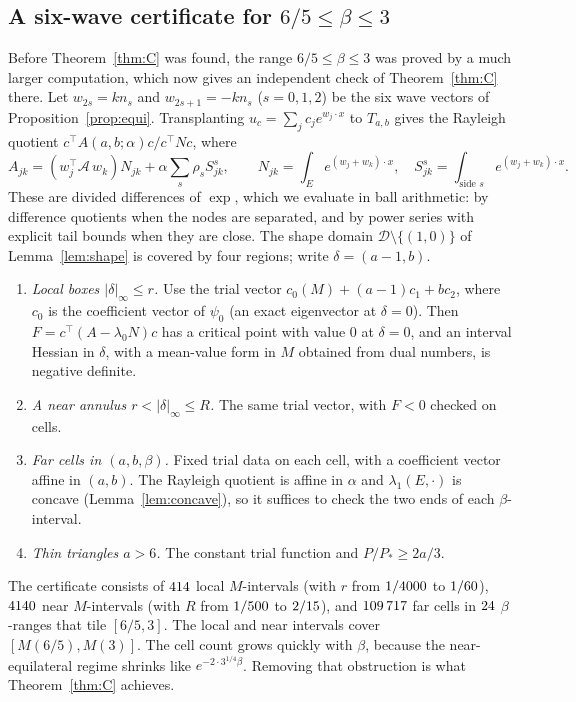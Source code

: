 \documentclass[11pt]{article}
\theoremstyle{remark}
\newcommand{\E}{E}
\begin{document}
\subsection{A six-wave certificate for \texorpdfstring{$6/5\le\beta\le3$}{6/5 <= beta <= 3}}\label{sec:six}
Before Theorem~\ref{thm:C} was found, the range $6/5\le\beta\le3$ was proved by a much larger computation,
which now gives an independent check of Theorem~\ref{thm:C} there. Let $w_{2s}=kn_s$ and $w_{2s+1}=-kn_s$
($s=0,1,2$) be the six wave vectors of Proposition~\ref{prop:equi}. Transplanting
$u_c=\sum_jc_je^{w_j\cdot x}$ to $T_{a,b}$ gives the Rayleigh quotient $c^\top A(a,b;\alpha)c/c^\top Nc$,
where
\[
  A_{jk}=(w_j^\top\mathcal A\,w_k)N_{jk}+\alpha\sum_s\rho_sS^s_{jk},\qquad
  N_{jk}=\int_\E e^{(w_j+w_k)\cdot x},\quad S^s_{jk}=\int_{\text{side }s}e^{(w_j+w_k)\cdot x}.
\]
These are divided differences of $\exp$, which we evaluate in ball arithmetic: by difference quotients
when the nodes are separated, and by power series with explicit tail bounds when they are close. The shape
domain $\mathcal D\setminus\{(1,0)\}$ of Lemma~\ref{lem:shape} is covered by four regions; write
$\delta=(a-1,b)$.
\begin{enumerate}
\item[(a)] \emph{Local boxes $|\delta|_\infty\le r$.} Use the trial vector $c_0(M)+(a-1)c_1+bc_2$, where
$c_0$ is the coefficient vector of $\psi_0$ (an exact eigenvector at $\delta=0$). Then
$F=c^\top(A-\lambda_0N)c$ has a critical point with value $0$ at $\delta=0$, and an interval Hessian in
$\delta$, with a mean-value form in $M$ obtained from dual numbers, is negative definite.
\item[(b)] \emph{A near annulus $r<|\delta|_\infty\le R$.} The same trial vector, with $F<0$ checked on
cells.
\item[(c)] \emph{Far cells in $(a,b,\beta)$.} Fixed trial data on each cell, with a coefficient vector
affine in $(a,b)$. The Rayleigh quotient is affine in $\alpha$ and $\lambda_1(\E,\cdot)$ is concave
(Lemma~\ref{lem:concave}), so it suffices to check the two ends of each $\beta$-interval.
\item[(d)] \emph{Thin triangles $a>6$.} The constant trial function and $P/P_*\ge2a/3$.
\end{enumerate}
The certificate consists of $414$ local $M$-intervals (with $r$ from $1/4000$ to
$1/60$), $4140$ near $M$-intervals (with $R$ from $1/500$ to $2/15$), and
$109\,717$ far cells in $24$ $\beta$-ranges that tile $[6/5,3]$. The local and near
intervals cover $[M(6/5),M(3)]$. The cell count grows quickly with $\beta$, because the near-equilateral
regime shrinks like $e^{-2\cdot3^{1/4}\beta}$. Removing that obstruction is what Theorem~\ref{thm:C}
achieves.
\end{document}
